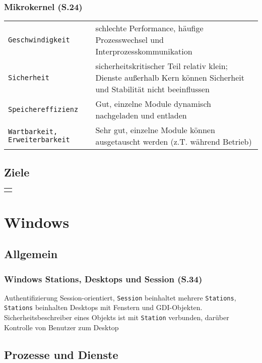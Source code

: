 \begin{multicols}{3}
\subsubsection{Mikrokernel (S.24)}
\begin{tabular}{@{}p{\the\MyLen}%
		@{}p{\linewidth-\the\MyLen}@{}}
	\texttt{Geschwindigkeit} & schlechte Performance, häufige Prozesswechsel und Interprozesskommunikation\\
	\texttt{Sicherheit} & sicherheitskritischer Teil relativ klein; Dienste außerhalb Kern können Sicherheit und Stabilität nicht beeinflussen\\
	\texttt{Speichereffizienz} & Gut, einzelne Module dynamisch nachgeladen und entladen\\
	\texttt{Wartbarkeit, Erweiterbarkeit} & Sehr gut, einzelne Module können ausgetauscht werden (z.T. während Betrieb)\\
\end{tabular}

\subsection{Ziele}
\begin{tabular}{@{}p{\the\MyLen}@{}}
	\texttt{}
\end{tabular}



\section{Windows}

\subsection{Allgemein}
\subsubsection{Windows Stations, Desktops und Session (S.34)}
Authentifizierung Session-orientiert, \texttt{Session} beinhaltet mehrere \texttt{Stations}, \texttt{Stations} beinhalten Desktops mit Fenstern und GDI-Objekten. Sicherheitsbeschreiber eines Objekts ist mit \texttt{Station} verbunden, darüber Kontrolle von Benutzer zum Desktop

\subsection{Prozesse und Dienste}

\end{multicols}
